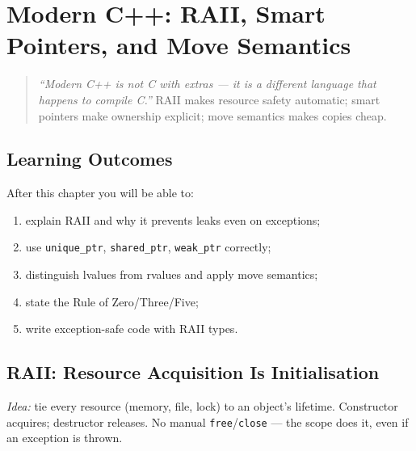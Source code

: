 \chapter{Modern C++: RAII, Smart Pointers, and Move Semantics}
\label{ch:modern-cpp}

\begin{quote}
\emph{``Modern C++ is not C with extras --- it is a different language that happens to compile C.''} RAII makes resource safety automatic; smart pointers make ownership explicit; move semantics makes copies cheap.
\end{quote}

\noindent{}

\section*{Learning Outcomes}
After this chapter you will be able to:
\begin{enumerate}[label=(L\arabic*)]
    \item explain RAII and why it prevents leaks even on exceptions;
    \item use \texttt{unique\_ptr}, \texttt{shared\_ptr}, \texttt{weak\_ptr} correctly;
    \item distinguish lvalues from rvalues and apply move semantics;
    \item state the Rule of Zero/Three/Five;
    \item write exception-safe code with RAII types.
\end{enumerate}

\section{RAII: Resource Acquisition Is Initialisation}
\label{sec:raii}
\emph{Idea:} tie every resource (memory, file, lock) to an object's lifetime. Constructor acquires; destructor releases. No manual \texttt{free}/\texttt{close} --- the scope does it, even if an exception is thrown.

